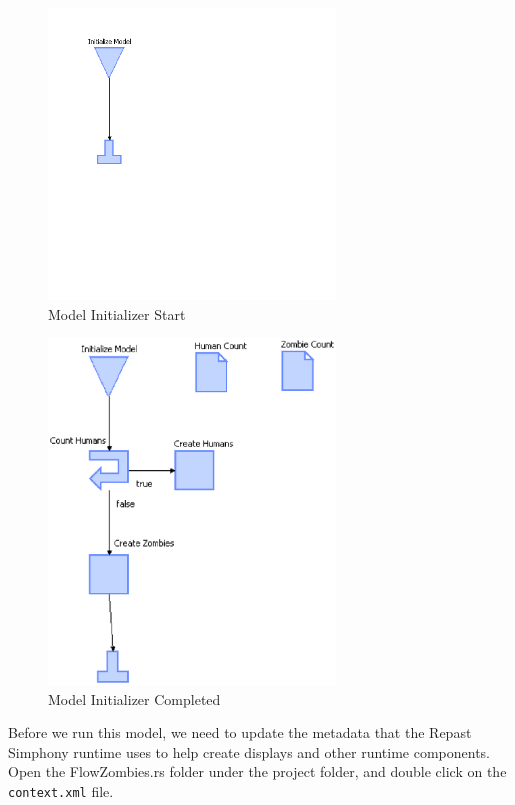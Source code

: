 \documentclass[11pt]{amsart}
\begin{document}
\begin{figure}[p]
\begin{center}
\vspace{.2in}
\centerline {
\includegraphics[width=3in]{figs/ModelInitializer_start.png}
}
\caption{Model Initializer Start}
\label{fig:mistart}
\end{center}
\end{figure}

\begin{figure}[p]
\begin{center}
\vspace{.2in}
\centerline {
\includegraphics[width=3in]{figs/ModelInitializer_complete.eps}
}
\caption{Model Initializer Completed}
\label{fig:micomplete}
\end{center}
\end{figure}

\FloatBarrier

Before we run this model, we need to update the metadata that the Repast Simphony runtime uses to help create displays and other runtime components. Open the FlowZombies.rs folder under the project folder, and double click on the \texttt{context.xml} file.
\end{document}
